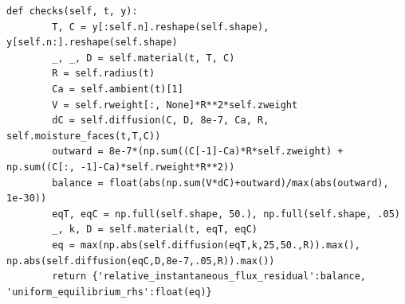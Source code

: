 \documentclass[12pt,a4paper]{ctexart}
\begin{document}
\begin{lstlisting}[caption={solve\_problem4.py }]
    def checks(self, t, y):
        T, C = y[:self.n].reshape(self.shape), y[self.n:].reshape(self.shape)
        _, _, D = self.material(t, T, C)
        R = self.radius(t)
        Ca = self.ambient(t)[1]
        V = self.rweight[:, None]*R**2*self.zweight
        dC = self.diffusion(C, D, 8e-7, Ca, R, self.moisture_faces(t,T,C))
        outward = 8e-7*(np.sum((C[-1]-Ca)*R*self.zweight) + np.sum((C[:, -1]-Ca)*self.rweight*R**2))
        balance = float(abs(np.sum(V*dC)+outward)/max(abs(outward), 1e-30))
        eqT, eqC = np.full(self.shape, 50.), np.full(self.shape, .05)
        _, k, D = self.material(t, eqT, eqC)
        eq = max(np.abs(self.diffusion(eqT,k,25,50.,R)).max(), np.abs(self.diffusion(eqC,D,8e-7,.05,R)).max())
        return {'relative_instantaneous_flux_residual':balance, 'uniform_equilibrium_rhs':float(eq)}



\end{lstlisting}
\end{document}

